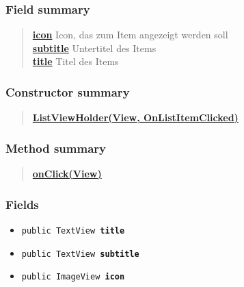 \documentclass[11pt,a4paper]{report}
\begin{document}
{{{{{{{{{{{{{{{{{{\subsubsection{Field summary}{
\begin{verse}
\hyperlink{edu.kit.pse17.go_app.RecyclerView.ListViewHolder.icon}{{\bf icon}} Icon, das zum Item angezeigt werden soll\\
\hyperlink{edu.kit.pse17.go_app.RecyclerView.ListViewHolder.subtitle}{{\bf subtitle}} Untertitel des Items\\
\hyperlink{edu.kit.pse17.go_app.RecyclerView.ListViewHolder.title}{{\bf title}} Titel des Items\\
\end{verse}
}
\subsubsection{Constructor summary}{
\begin{verse}
\hyperlink{edu.kit.pse17.go_app.RecyclerView.ListViewHolder(View, edu.kit.pse17.go_app.RecyclerView.OnListItemClicked)}{{\bf ListViewHolder(View, OnListItemClicked)}} \\
\end{verse}
}
\subsubsection{Method summary}{
\begin{verse}
\hyperlink{edu.kit.pse17.go_app.RecyclerView.ListViewHolder.onClick(View)}{{\bf onClick(View)}} \\
\end{verse}
}
\subsubsection{Fields}{
\begin{itemize}
\item{
\label{edu.kit.pse17.go_app.RecyclerView.ListViewHolder.title}\hypertarget{edu.kit.pse17.go_app.RecyclerView.ListViewHolder.title}{\texttt{public TextView\ {\bf  title}}
}
}
\item{
\label{edu.kit.pse17.go_app.RecyclerView.ListViewHolder.subtitle}\hypertarget{edu.kit.pse17.go_app.RecyclerView.ListViewHolder.subtitle}{\texttt{public TextView\ {\bf  subtitle}}
}
}
\item{
\label{edu.kit.pse17.go_app.RecyclerView.ListViewHolder.icon}\hypertarget{edu.kit.pse17.go_app.RecyclerView.ListViewHolder.icon}{\texttt{public ImageView\ {\bf  icon}}
}
}
\end{itemize}
}
}}}}}}}}}}}}}}}}}}
\end{document}
